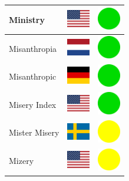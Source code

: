 \documentclass[12pt, a4paper, twoside]{report}
\begin{document}
\begin{center}
\begin{longtable}{|p{5cm}|p{2cm}|p{2cm}|}
			Ministry & \includegraphics[width=1cm]{4x3/us} & \includegraphics[width=1cm]{likes/y} \\ \hline
			Misanthropia & \includegraphics[width=1cm]{4x3/nl} & \includegraphics[width=1cm]{likes/y} \\ \hline
			Misanthropic & \includegraphics[width=1cm]{4x3/de} & \includegraphics[width=1cm]{likes/y} \\ \hline
			Misery Index & \includegraphics[width=1cm]{4x3/us} & \includegraphics[width=1cm]{likes/y} \\ \hline
			Mister Misery & \includegraphics[width=1cm]{4x3/se} & \includegraphics[width=1cm]{likes/m} \\ \hline
			Mizery & \includegraphics[width=1cm]{4x3/us} & \includegraphics[width=1cm]{likes/m} \\ \hline

\end{longtable}
\end{center}
\end{document}
